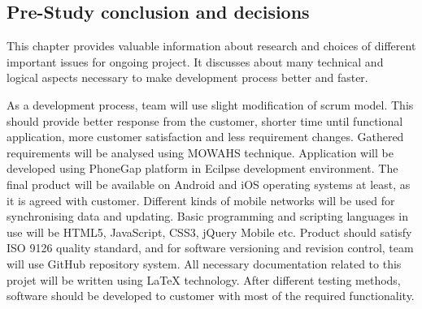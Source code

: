 \subsection{Pre-Study conclusion and decisions}

This chapter provides valuable information about research and choices of different important issues for ongoing project. It discusses about many technical and logical aspects necessary to make development process better and faster.\newline

As a development process, team will use slight modification of scrum model. This should provide better response from the customer, shorter time until functional application, more customer satisfaction and less requirement changes. Gathered requirements will be analysed using MOWAHS technique. Application will be developed using PhoneGap platform in Ecilpse development environment. The final product will be available on Android and iOS operating systems at least, as it is agreed with customer. Different kinds of mobile networks will be used for synchronising data and updating. Basic programming and scripting languages in use will be HTML5, JavaScript, CSS3, jQuery Mobile etc. Product should satisfy ISO 9126 quality standard, and for software versioning and revision control, team will use GitHub repository system. All necessary documentation related to this projet will be written using LaTeX technology. After different testing methods, software should be developed to customer with most of the required functionality.